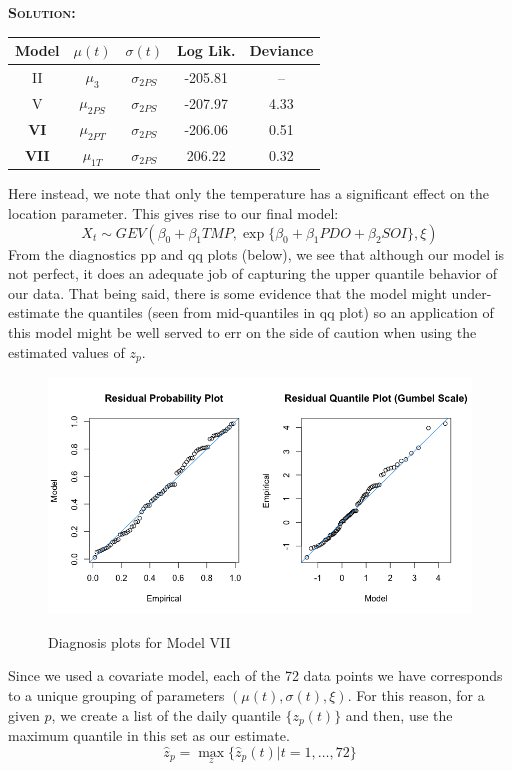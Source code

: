 \documentclass[12pt,oneside]{article}
\newenvironment{solution}
    {\textbf{\textsc{Solution:}}\\}
    {\newpage}
\begin{document}
\begin{solution}
\begin{center}
    \begin{tabular}{||c||c|c|c|c||}\hline
     Model& $\mu(t)$ & $\sigma(t)$&Log Lik.& Deviance \\\hline
     II&$\mu_3$ & $\sigma_{2PS}$ & -205.81 & --  \\\hline
     V& $\mu_{2PS}$ & $\sigma_{2PS}$ & -207.97 & 4.33\\\hline
     \textbf{VI}& $\mu_{2PT}$ & $\sigma_{2PS}$ & -206.06 & 0.51 \\\hline
     \textbf{VII}& $\mu_{1T}$ & $\sigma_{2PS}$ &  206.22 & 0.32 \\\hline
\end{tabular}
\end{center}
Here instead, we note that only the temperature has a significant effect on the location parameter. This gives rise to our final model:
\[X_t\sim GEV(\beta_0+\beta_1TMP, \exp\{\beta_0+\beta_1PDO+\beta_2SOI\}, \xi)\]
From the diagnostics pp and qq plots (below), we see that although our model is not perfect, it does an adequate job of capturing the upper quantile behavior of our data. That being said, there is some evidence that the model might under-estimate the quantiles (seen from mid-quantiles in qq plot) so an application of this model might be well served to err on the side of caution when using the estimated values of $z_p$.
\begin{figure}[H]
\begin{center}
{\includegraphics[width=5in]{Assignments/a3/mod7-diag.png}}
\caption{Diagnosis plots for Model VII}
\end{center}
\end{figure}
Since we used a covariate model, each of the 72 data points we have corresponds to a unique grouping of parameters $(\mu(t), \sigma(t), \xi)$. For this reason, for a given $p$, we create a list of the daily quantile $\{z_p(t)\}$ and then, use the maximum quantile in this set as our estimate. 
\[\hat{z}_p = \max_{z}\{\hat{z}_p(t)| t=1,\hdots,72\}\]
\end{solution}
\end{document}

